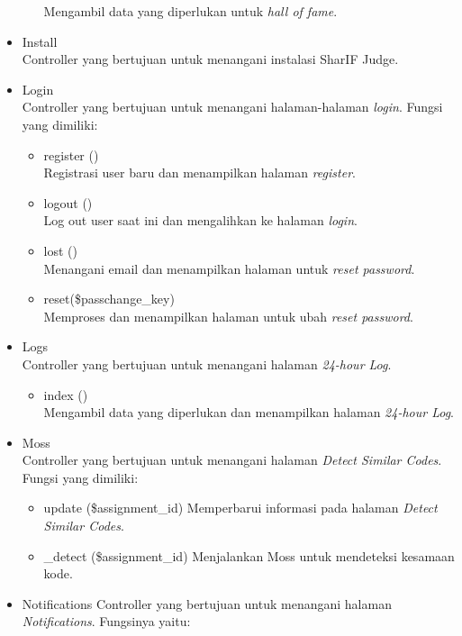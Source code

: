 \begin{itemize}
\begin{itemize}
 Mengambil data yang diperlukan untuk \textit{hall of fame}.
    \end{itemize}
        \item Install \\
 Controller yang bertujuan untuk menangani instalasi SharIF Judge.
        \item Login \\
 Controller yang bertujuan untuk menangani halaman-halaman \textit{login}. Fungsi yang dimiliki:
    \begin{itemize}
        \item register () \\
 Registrasi user baru dan menampilkan halaman \textit{register}.
        \item logout () \\
 Log out user saat ini dan mengalihkan ke halaman \textit{login}.
        \item lost () \\
 Menangani email dan menampilkan halaman untuk \textit{reset password}.
        \item reset(\$passchange\_key) \\
 Memproses dan menampilkan halaman untuk ubah \textit{reset password}.
    \end{itemize}
        \item Logs \\
 Controller yang bertujuan untuk menangani halaman \textit{24-hour Log}.
    \begin{itemize}
        \item index () \\
        Mengambil data yang diperlukan dan menampilkan halaman \textit{24-hour Log}.
    \end{itemize}
        \item Moss \\
 Controller yang bertujuan untuk menangani halaman \textit{Detect Similar Codes}. Fungsi yang dimiliki:
    \begin{itemize}
        \item update (\$assignment\_id)
 Memperbarui informasi pada halaman \textit{Detect Similar Codes}.
        \item \_detect (\$assignment\_id)
 Menjalankan Moss untuk mendeteksi kesamaan kode.
    \end{itemize}
        \item Notifications
 Controller yang bertujuan untuk menangani halaman \textit{Notifications}. Fungsinya yaitu:
    \begin{itemize}

\end{itemize}
\end{itemize}
